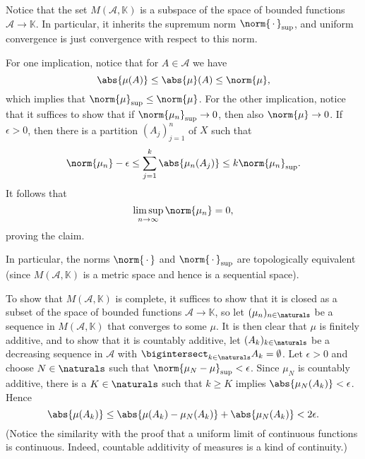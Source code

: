 \documentclass[a4paper, 11pt]{memoir}
\theoremstyle{plaincustomnumber}
\theoremstyle{changedotbreakcustomnumber}
\newcommand{\calA}{\mathcal{A}}
\newcommand{\fieldK}{\mathbb{K}}
\begin{document}
\begin{solution}
    Notice that the set $M(\calA,\fieldK)$ is a subspace of the space of bounded functions $\calA \to \fieldK$. In particular, it inherits the supremum norm $\norm{\,\cdot\,}_{\sup}$, and uniform convergence is just convergence with respect to this norm.

    For one implication, notice that for $A \in \calA$ we have
    \begin{equation*}
        \abs{\mu(A)}
            \leq \abs{\mu}(A)
            \leq \norm{\mu},
    \end{equation*}
    which implies that $\norm{\mu}_{\sup} \leq \norm{\mu}$. For the other implication, notice that it suffices to show that if $\norm{\mu_n}_{\sup} \to 0$, then also $\norm{\mu} \to 0$. If $\epsilon > 0$, then there is a partition $(A_j)_{j=1}^n$ of $X$ such that
    \begin{equation*}
        \norm{\mu_n} - \epsilon
            \leq \sum_{j=1}^k \abs{\mu_n(A_j)}
            \leq k \norm{\mu_n}_{\sup}.
    \end{equation*}
    It follows that
    \begin{equation*}
        \limsup_{n \to \infty} \norm{\mu_n}
            = 0,
    \end{equation*}
    proving the claim.

    In particular, the norms $\norm{\,\cdot\,}$ and $\norm{\,\cdot\,}_{\sup}$ are topologically equivalent (since $M(\calA,\fieldK)$ is a metric space and hence is a sequential space).

    To show that $M(\calA,\fieldK)$ is complete, it suffices to show that it is closed as a subset of the space of bounded functions $\calA \to \fieldK$, so let $(\mu_n)_{n \in \naturals}$ be a sequence in $M(\calA,\fieldK)$ that converges to some $\mu$. It is then clear that $\mu$ is finitely additive, and to show that it is countably additive, let $(A_k)_{k \in \naturals}$ be a decreasing sequence in $\calA$ with $\bigintersect_{k \in \naturals} A_k = \emptyset$. Let $\epsilon > 0$ and choose $N \in \naturals$ such that $\norm{\mu_N - \mu}_{\sup} < \epsilon$. Since $\mu_N$ is countably additive, there is a $K \in \naturals$ such that $k \geq K$ implies $\abs{\mu_N(A_k)} < \epsilon$. Hence
    \begin{equation*}
        \abs{\mu(A_k)}
            \leq \abs{\mu(A_k) - \mu_N(A_k)} + \abs{\mu_N(A_k)}
            < 2\epsilon.
    \end{equation*}
    (Notice the similarity with the proof that a uniform limit of continuous functions is continuous. Indeed, countable additivity of measures is a kind of continuity.)
\end{solution}
\end{document}
